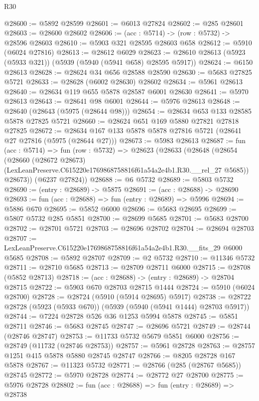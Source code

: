 \begin{lexlean}{R30}
\begin{coremodule}
@28600 := @5892 @28599
@28601 := @6013 @27824
@28602 := @285 @28601
@28603 := @28600 @28602
@28606 := (acc : @5714) -> (row : @5732) -> @28596 @28603
@28610 := @5903 @321 @28595 @28603 @658
@28612 := @5910 (@6024 @27816)
@28613 := @28612 @6029
@28623 := @28610 @28613 (@5923 (@5933 @321)) (@5939 (@5940 (@5941 @658) @28595 @5917))
@28624 := @6150 @28613
@28628 := @28624 @34 @656 @28588 @28590
@28630 := @5683 @27825 @5721
@28633 := @28628 (@6002 @28630) @28602
@28634 := @5961 @28613
@28640 := @28634 @119 @655 @5878 @28587 @6001 @28630
@28641 := @5970 @28613
@28643 := @28641 @98 @6001
@28644 := @5976 @28613
@28648 := @28640 (@28643 (@5975 (@28644 @98)))
@28654 := @28634 @653 @133 @28585 @5878 @27825 @5721
@28660 := @28624 @651 @169 @5880 @27821 @27818 @27825
@28672 := @28634 @167 @133 @5878 @5878 @27816 @5721 (@28641 @27 @27816 (@5975 (@28644 @27)))
@28673 := @5983 @28613
@28687 := fun (acc : @5714) =>
  fun (row : @5732) =>
  @28623
    (@28633
      (@28648
        (@28654
          (@28660
            (@28672 @28673)
            (LexLeanPreserve.C615220e1769868758816f61a54a2e4b1.R30.__rel_27 @5685))
          @28673))
      (@6237 @27824))
@28688 := @6 @5732
@28689 := @5803 @5732
@28690 := (entry : @28689) -> @5875
@28691 := (acc : @28688) -> @28690
@28693 := fun (acc : @28688) => fun (entry : @28689) => @5996
@28694 := @5886 @670
@28695 := @5852 @6000
@28696 := @5683 @28695
@28699 := @5807 @5732 @285 @5851
@28700 := @28699 @5685
@28701 := @5683 @28700
@28702 := @28701 @5721
@28703 := @28696 @28702
@28704 := @28694 @28703
@28707 := LexLeanPreserve.C615220e1769868758816f61a54a2e4b1.R30.__fits_29 @6000 @5685
@28708 := @5892 @28707
@28709 := @2 @5732
@28710 := @11346 @5732
@28711 := @28710 @5685
@28713 := @28709 @28711 @6000
@28715 := @28708 (@5852 @28713)
@28718 := (acc : @28688) -> (entry : @28689) -> @28704 @28715
@28722 := @5903 @670 @28703 @28715 @1444
@28724 := @5910 (@6024 @28700)
@28728 := @28724 (@5910 (@5914 @28695) @5917)
@28738 := @28722 @28728 (@5923 (@5933 @670)) (@5939 (@5940 (@5941 @1444) @28703 @5917))
@28744 := @7224 @28728 @526 @36 @1253 @5994 @5878
@28745 := @5851 @28711
@28746 := @5683 @28745
@28747 := @28696 @5721
@28749 := @28744 (@28746 @28747)
@28753 := @11733 @5732 @5679 @5851 @6000
@28756 := @28749 (@11732 (@28746 @28753))
@28757 := @5961 @28728
@28763 := @28757 @1251 @415 @5878 @5880 @28745 @28747
@28766 := @8205 @28728 @167 @5878
@28767 := @11323 @5732
@28771 := @28766 (@285 (@28767 @5685)) @28745
@28772 := @5970 @28728
@28774 := @28772 @27 @28700
@28775 := @5976 @28728
@28802 := fun (acc : @28688) =>
  fun (entry : @28689) =>
  @28738

\end{coremodule}
\end{lexlean}
